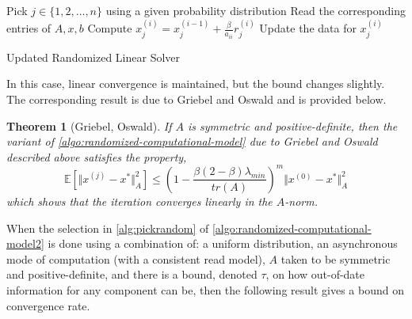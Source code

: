 \documentclass{article}
\newtheorem{theorem}{Theorem}
\theoremstyle{definition}
\theoremstyle{example}
\theoremstyle{example}
\theoremstyle{example}
\begin{document}
\begin{algorithm}[ht!]
	\DontPrintSemicolon
	 {
		 {
			Pick $j \in \{1, 2, \ldots, n\}$ using a given probability distribution \; \label{alg:pickrandom2}
			Read the corresponding entries of $A, x, b$ \label{step:read2}\;
			Compute $x^{(i)}_j = x^{(i-1)}_j + \frac{\beta}{a_{ii}} r^{(i)}_j$ \;
			Update the data for $x^{(i)}_j$ \;
		}
	}
	\caption{Updated Randomized Linear Solver}
	\label{algo:randomized-computational-model2}
\end{algorithm}

In this case, linear convergence is maintained, but the bound changes slightly. The corresponding result is due to Griebel and Oswald \cite{griebel2012greedy} and is provided below.

\begin{theorem}[Griebel, Oswald]
	If $A$ is symmetric and positive-definite, then the variant of \cref{algo:randomized-computational-model} due to Griebel and Oswald described above satisfies the property,
		\begin{equation}
			\mathbb{E}[\Vert x^{(j)} - x^* \Vert_A^2] \leq \left(1 - \frac{\beta (2 - \beta)\lambda_{min}}{tr(A)}\right)^m \Vert x^{(0)} - x^* \Vert_A^2
		\end{equation}
	which shows that the iteration converges linearly in the $A$-norm.
\end{theorem}
	

When the selection in \cref{alg:pickrandom} of \cref{algo:randomized-computational-model2} is done using a combination of: a uniform distribution, an asynchronous mode of computation (with a consistent read model), $A$ taken to be symmetric and positive-definite, and there is a bound, denoted $\tau$, on how out-of-date information for any component can be, then the following result gives a bound on convergence rate.
\end{document}
